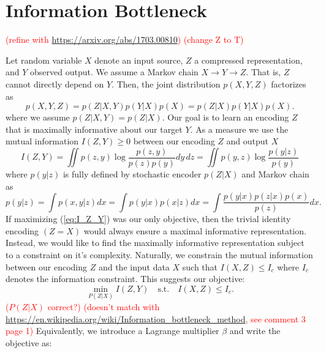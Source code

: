 \documentclass[11pt]{article}
\newcommand\myworries[1]{\textcolor{red}{(#1)}}
\begin{document}
\section{Information Bottleneck}


\myworries{refine with \url{https://arxiv.org/abs/1703.00810}}
\myworries{change Z to T}

Let random variable $X$ denote an input source, $Z$ a compressed representation, and $Y$ observed output. We assume a Markov chain $X\rightarrow Y \rightarrow Z$. That is, $Z$ cannot directly depend on $Y$. Then, the joint distribution $p(X,Y,Z)$ factorizes as
\begin{equation}
p(X, Y, Z) = p(Z\vert X,Y)p(Y\vert X)p(X) = p(Z\vert X)p(Y\vert X)p(X).
\end{equation}
where we assume $p(Z\vert X,Y) = p(Z\vert X)$.
Our goal is to learn an encoding $Z$ that is maximally informative about our target $Y$. As a measure we use the mutual information $I(Z,Y) \geq 0$ between our encoding $Z$ and output $X$
\begin{equation}
I(Z,Y) = \iint p(z,y) \log \frac{p(z,y)}{p(z)p(y)} dy\, dz = \iint p(y,z) \log \frac{p(y\vert z)}{p(y)}
\label{eq:I_Z_Y}
\end{equation}
where  $p(y\vert z)$ is fully defined by stochastic encoder $p(Z\vert X)$ and Markov chain as
\begin{equation}
p(y\vert z) = \int p(x,y\vert z) dx = \int p(y \vert x) p(x \vert z) dx = \int \frac{p(y \vert x)p(z \vert x) p(x)}{p(z)}dx.
\label{eq:p_y_z}
\end{equation}
If maximizing (\ref{eq:I_Z_Y}) was our only objective, then the trivial identity encoding ${(Z = X)}$ would always ensure a maximal informative representation. Instead, we would like to find the maximally informative representation subject to a constraint on it's complexity. Naturally, we constrain the mutual information between our encoding $Z$ and the input data $X$ such that $I(X,Z) \leq I_c$ where $I_c$ denotes the information constraint. This suggests our objective:
\begin{equation}
\underset{P(Z\vert X)}{\min} I(Z,Y) \quad\text{s.t.}\quad I(X,Z) \leq I_c.
\end{equation}
\myworries{$P(Z\vert X)$ correct?}
\myworries{doesn't match with \url{https://en.wikipedia.org/wiki/Information_bottleneck_method}, see comment 3 page 1}
Equivalently, we introduce a Lagrange multiplier $\beta$ and write the objective as:
\end{document}
